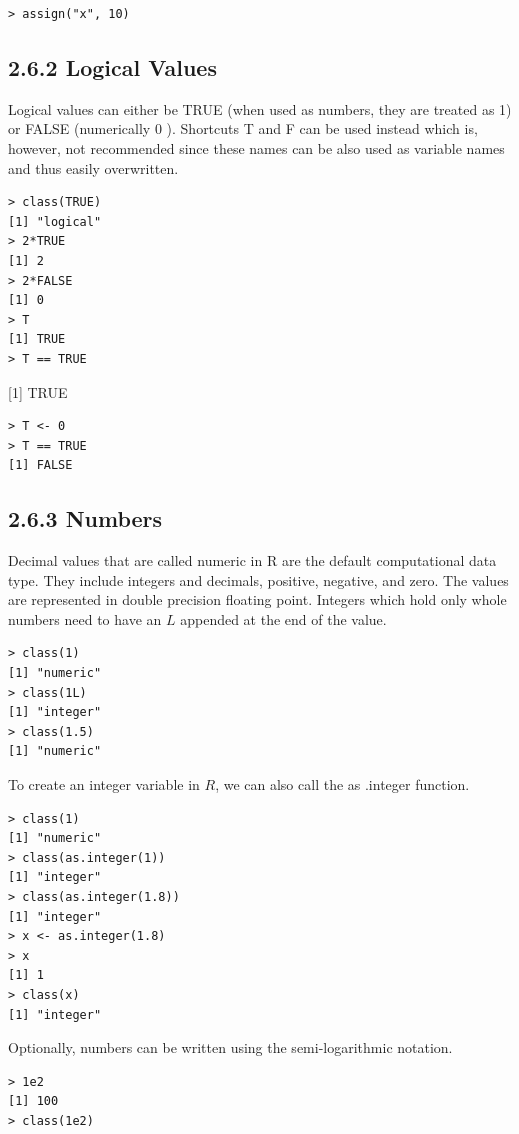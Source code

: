 \documentclass[10pt]{book}
\begin{document}
\begin{verbatim}
> assign("x", 10)
\end{verbatim}

\subsection*{2.6.2 Logical Values}
Logical values can either be TRUE (when used as numbers, they are treated as 1) or FALSE (numerically 0 ). Shortcuts T and F can be used instead which is, however, not recommended since these names can be also used as variable names and thus easily overwritten.

\begin{verbatim}
> class(TRUE)
[1] "logical"
> 2*TRUE
[1] 2
> 2*FALSE
[1] 0
> T
[1] TRUE
> T == TRUE
\end{verbatim}

[1] TRUE

\begin{verbatim}
> T <- 0
> T == TRUE
[1] FALSE
\end{verbatim}

\subsection*{2.6.3 Numbers}
Decimal values that are called numeric in R are the default computational data type. They include integers and decimals, positive, negative, and zero. The values are represented in double precision floating point. Integers which hold only whole numbers need to have an $L$ appended at the end of the value.

\begin{verbatim}
> class(1)
[1] "numeric"
> class(1L)
[1] "integer"
> class(1.5)
[1] "numeric"
\end{verbatim}

To create an integer variable in $R$, we can also call the as .integer function.

\begin{verbatim}
> class(1)
[1] "numeric"
> class(as.integer(1))
[1] "integer"
> class(as.integer(1.8))
[1] "integer"
> x <- as.integer(1.8)
> x
[1] 1
> class(x)
[1] "integer"
\end{verbatim}

Optionally, numbers can be written using the semi-logarithmic notation.

\begin{verbatim}
> 1e2
[1] 100
> class(1e2)
\end{verbatim}
\end{document}
